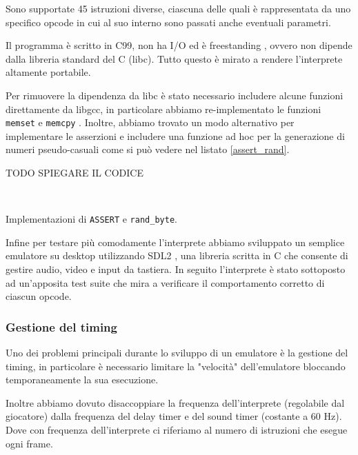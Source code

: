 \documentclass[a4paper]{article}
\begin{document}
Sono supportate 45 istruzioni diverse, ciascuna delle
quali è rappresentata da uno specifico opcode in cui al suo interno
sono passati anche eventuali parametri.

Il programma è scritto in C99, non ha I/O ed è freestanding
\cite{n1256:conformance}, ovvero non dipende dalla libreria
standard del C (libc). Tutto questo è mirato a rendere l'interprete
altamente portabile.

Per rimuovere la dipendenza da libc è stato necessario includere alcune funzioni direttamente da libgcc, in particolare abbiamo re-implementato le funzioni \texttt{memset} e \texttt{memcpy} . Inoltre, abbiamo trovato un modo alternativo per implementare le asserzioni e includere una funzione ad hoc per la generazione di numeri pseudo-casuali come si può vedere nel listato \ref{assert_rand}.

TODO SPIEGARE IL CODICE

\begin{Listing}[h!t]
    \centering
    \mbox{
        \quad
    }
    \caption{Implementazioni di \texttt{ASSERT} e \texttt{rand\_byte}.}
    \label{assert_rand}
\end{Listing}

Infine per testare più comodamente l'interprete abbiamo sviluppato un semplice emulatore su desktop utilizzando SDL2 \cite{libsdl:about}, una libreria scritta in C che consente di gestire audio, video e input da tastiera. In seguito l'interprete è stato sottoposto ad un'apposita test suite \cite{github:chip8-test-suite} che mira a verificare il comportamento corretto di ciascun opcode.

\subsubsection{Gestione del timing}

Uno dei problemi principali durante lo sviluppo di un emulatore è la gestione del timing, in particolare è necessario limitare la "velocità" dell'emulatore bloccando temporaneamente la sua esecuzione.

Inoltre abbiamo dovuto disaccoppiare la frequenza dell'interprete (regolabile dal giocatore) dalla frequenza del delay timer e del sound timer (costante a 60 Hz). Dove con frequenza dell'interprete ci riferiamo al numero di istruzioni che esegue ogni frame.

\end{document}
